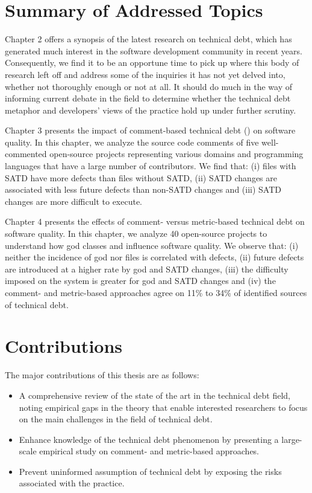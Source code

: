 
\section{Summary of Addressed Topics}


Chapter 2 offers a synopsis of the latest research on technical debt, which has generated much interest in the software development community in recent years. Consequently, we find it to be an opportune time to pick up where this body of research left off and address some of the inquiries it has not yet delved into, whether not thoroughly enough or not at all. It should do much in the way of informing current debate in the field to determine whether the technical debt metaphor and developers' views of the practice hold up under further scrutiny.

Chapter 3 presents the impact of comment-based technical debt (\SATD) on software quality. In this chapter, we analyze the source code comments of five well-commented open-source projects representing various domains and programming languages that have a large number of contributors. We find that: (i) files with SATD have more defects than files without SATD, (ii) SATD changes are associated with less future defects than non-SATD changes and (iii) SATD changes are more difficult to execute.

Chapter 4 presents the effects of comment- versus metric-based technical debt on software quality. In this chapter, we analyze 40 open-source projects to understand how god classes and \SATD influence software quality. We observe that: (i) neither the incidence of god nor \SATD files is correlated with defects, (ii) future defects are introduced at a higher rate by god and SATD changes, (iii) the difficulty imposed on the system is greater for god and SATD changes and (iv) the comment- and metric-based approaches agree on 11\% to 34\% of identified sources of technical debt.

\section{Contributions}
The major contributions of this thesis are as follows:

\begin{itemize}
		\item A comprehensive review of the state of the art in the technical debt field, noting empirical gaps in the theory that enable interested researchers to focus on the main challenges in the field of technical debt.
		\item Enhance knowledge of the technical debt phenomenon by presenting a large-scale empirical study on comment- and metric-based approaches.
		\item Prevent uninformed assumption of technical debt by exposing the risks associated with the practice.
\end{itemize}

